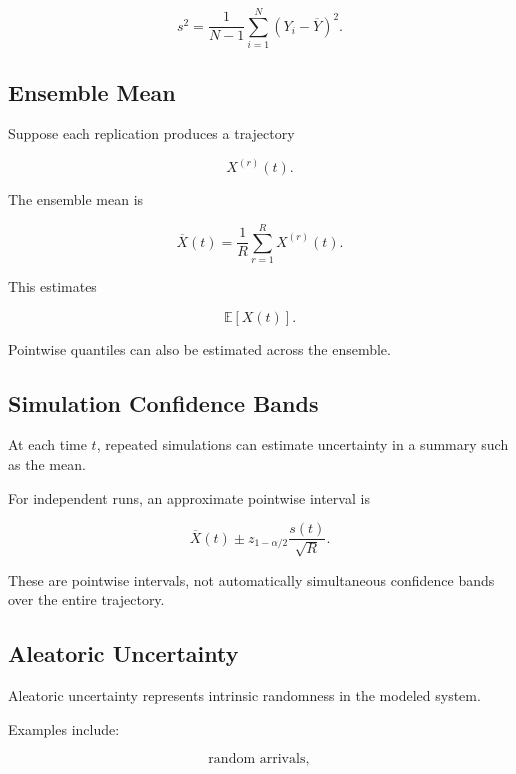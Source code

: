 \[
\boxed{
s^2
=
\frac1{N-1}
\sum_{i=1}^{N}
(Y_i-\overline{Y})^2.
}
\]

\subsection{Ensemble Mean}
\label{subsec:simulation-ensemble-mean}

Suppose each replication produces a trajectory

\[
X^{(r)}(t).
\]

The ensemble mean is

\[
\boxed{
\overline{X}(t)
=
\frac1R
\sum_{r=1}^{R}
X^{(r)}(t).
}
\]

This estimates

\[
\boxed{
\mathbb{E}[X(t)].
}
\]

Pointwise quantiles can also be estimated across the ensemble.

\subsection{Simulation Confidence Bands}
\label{subsec:simulation-confidence-bands}

At each time \(t\), repeated simulations can estimate uncertainty in a
summary such as the mean.

For independent runs, an approximate pointwise interval is

\[
\boxed{
\overline{X}(t)
\pm
z_{1-\alpha/2}
\frac{
s(t)
}{
\sqrt{R}
}.
}
\]

These are pointwise intervals, not automatically simultaneous confidence
bands over the entire trajectory.

\subsection{Aleatoric Uncertainty}
\label{subsec:simulation-aleatoric-uncertainty}

Aleatoric uncertainty represents intrinsic randomness in the modeled
system.

Examples include:

\[
\boxed{
\text{random arrivals},
}
\]

